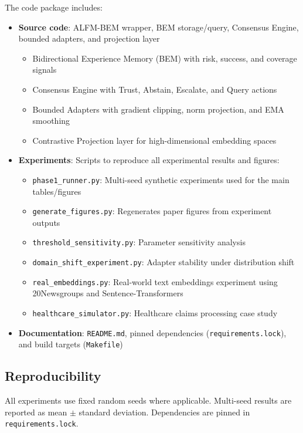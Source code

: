 \documentclass[11pt]{article}
\begin{document}
The code package includes:
\begin{itemize}
    \item \textbf{Source code}: ALFM-BEM wrapper, BEM storage/query, Consensus Engine, bounded adapters, and projection layer
    \begin{itemize}
        \item Bidirectional Experience Memory (BEM) with risk, success, and coverage signals
        \item Consensus Engine with Trust, Abstain, Escalate, and Query actions
        \item Bounded Adapters with gradient clipping, norm projection, and EMA smoothing
        \item Contrastive Projection layer for high-dimensional embedding spaces
    \end{itemize}
    \item \textbf{Experiments}: Scripts to reproduce all experimental results and figures:
    \begin{itemize}
        \item \texttt{phase1\_runner.py}: Multi-seed synthetic experiments used for the main tables/figures
        \item \texttt{generate\_figures.py}: Regenerates paper figures from experiment outputs
        \item \texttt{threshold\_sensitivity.py}: Parameter sensitivity analysis
        \item \texttt{domain\_shift\_experiment.py}: Adapter stability under distribution shift
        \item \texttt{real\_embeddings.py}: Real-world text embeddings experiment using 20Newsgroups and Sentence-Transformers
        \item \texttt{healthcare\_simulator.py}: Healthcare claims processing case study
    \end{itemize}
    \item \textbf{Documentation}: \texttt{README.md}, pinned dependencies (\texttt{requirements.lock}), and build targets (\texttt{Makefile})
\end{itemize}

\subsection*{Reproducibility}

All experiments use fixed random seeds where applicable. Multi-seed results are reported as mean $\pm$ standard deviation. Dependencies are pinned in \texttt{requirements.lock}.
\end{document}

